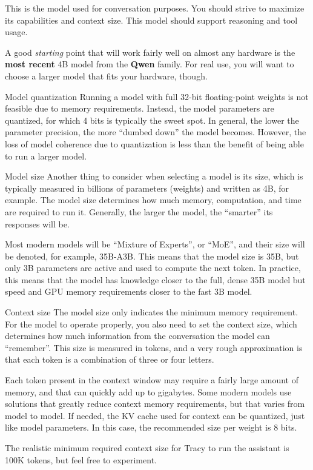 \documentclass[hidelinks,titlepage,a4paper,twoside]{article}
\begin{document}
This is the model used for conversation purposes. You should strive to maximize its capabilities and context size. This model should support reasoning and tool usage.

A good \emph{starting} point that will work fairly well on almost any hardware is the \textbf{most recent} 4B model from the \textbf{Qwen} family. For real use, you will want to choose a larger model that fits your hardware, though.

\begin{bclogo}[
noborder=true,
couleur=black!5,
logo=\bclampe
]{Model quantization}
Running a model with full 32-bit floating-point weights is not feasible due to memory requirements. Instead, the model parameters are quantized, for which 4 bits is typically the sweet spot. In general, the lower the parameter precision, the more \enquote{dumbed down} the model becomes. However, the loss of model coherence due to quantization is less than the benefit of being able to run a larger model.
\end{bclogo}

\begin{bclogo}[
noborder=true,
couleur=black!5,
logo=\bclampe
]{Model size}
Another thing to consider when selecting a model is its size, which is typically measured in billions of parameters (weights) and written as 4B, for example. The model size determines how much memory, computation, and time are required to run it. Generally, the larger the model, the \enquote{smarter} its responses will be.

Most modern models will be \enquote{Mixture of Experts}, or \enquote{MoE}, and their size will be denoted, for example, 35B-A3B. This means that the model size is 35B, but only 3B parameters are active and used to compute the next token. In practice, this means that the model has knowledge closer to the full, dense 35B model but speed and GPU memory requirements closer to the fast 3B model.
\end{bclogo}

\begin{bclogo}[
noborder=true,
couleur=black!5,
logo=\bclampe
]{Context size}
The model size only indicates the minimum memory requirement. For the model to operate properly, you also need to set the context size, which determines how much information from the conversation the model can \enquote{remember}. This size is measured in tokens, and a very rough approximation is that each token is a combination of three or four letters.

Each token present in the context window may require a fairly large amount of memory, and that can quickly add up to gigabytes. Some modern models use solutions that greatly reduce context memory requirements, but that varies from model to model. If needed, the KV cache used for context can be quantized, just like model parameters. In this case, the recommended size per weight is 8 bits.

The realistic minimum required context size for Tracy to run the assistant is 100K tokens, but feel free to experiment.
\end{bclogo}
\end{document}
